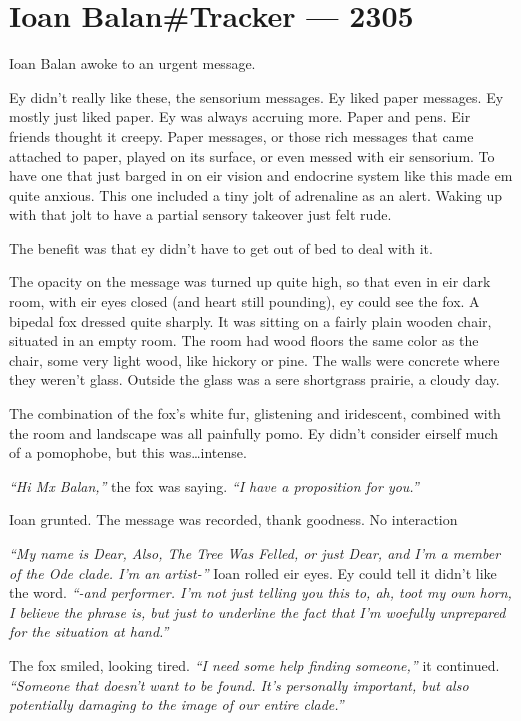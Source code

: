 \chapter*{Ioan Balan\#Tracker — 2305}

Ioan Balan awoke to an urgent message.

Ey didn't really like these, the sensorium messages. Ey liked paper messages. Ey mostly just liked paper. Ey was always accruing more. Paper and pens. Eir friends thought it creepy. Paper messages, or those rich messages that came attached to paper, played on its surface, or even messed with eir sensorium. To have one that just barged in on eir vision and endocrine system like this made em quite anxious. This one included a tiny jolt of adrenaline as an alert. Waking up with that jolt to have a partial sensory takeover just felt rude.

The benefit was that ey didn't have to get out of bed to deal with it.

The opacity on the message was turned up quite high, so that even in eir dark room, with eir eyes closed (and heart still pounding), ey could see the fox. A bipedal fox dressed quite sharply. It was sitting on a fairly plain wooden chair, situated in an empty room. The room had wood floors the same color as the chair, some very light wood, like hickory or pine. The walls were concrete where they weren't glass. Outside the glass was a sere shortgrass prairie, a cloudy day.

The combination of the fox's white fur, glistening and iridescent, combined with the room and landscape was all painfully pomo. Ey didn't consider eirself much of a pomophobe, but this was\ldots{}intense.

\emph{``Hi Mx Balan,''} the fox was saying. \emph{``I have a proposition for you.''}

Ioan grunted. The message was recorded, thank goodness. No interaction

\emph{``My name is Dear, Also, The Tree Was Felled, or just Dear, and I'm a member of the Ode clade. I'm an artist-''} Ioan rolled eir eyes. Ey could tell it didn't like the word. \emph{``-and performer. I'm not just telling you this to, ah, toot my own horn, I believe the phrase is, but just to underline the fact that I'm woefully unprepared for the situation at hand.''}

The fox smiled, looking tired. \emph{``I need some help finding someone,''} it continued. \emph{``Someone that doesn't want to be found. It's personally important, but also potentially damaging to the image of our entire clade.''}

